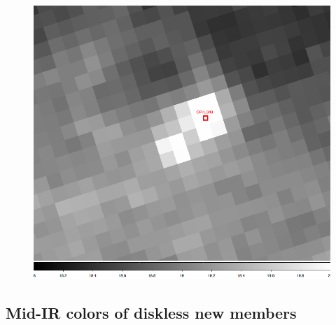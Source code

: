 \begin{figure}[ht!]
\begin{minipage}[b]{0.3\linewidth}
\end{minipage}
\hspace{0.5cm}
\begin{minipage}[b]{0.3\linewidth}
\centering
\includegraphics[scale=0.15]{chIMACS/figures/OPH_349_IRAC4_image}
\end{minipage}
\end{figure}

\subsection{Mid-IR colors of diskless new members}

